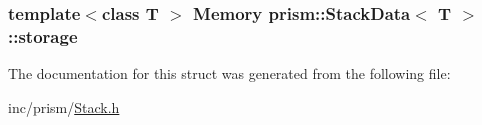 \subsubsection[{\texorpdfstring{storage}{storage}}]{\setlength{\rightskip}{0pt plus 5cm}template$<$class T $>$ {\bf Memory} {\bf prism\+::\+Stack\+Data}$<$ T $>$\+::storage}\hypertarget{structprism_1_1_stack_data_a5e74274b678041cfd7676d08eed3864a}{}\label{structprism_1_1_stack_data_a5e74274b678041cfd7676d08eed3864a}


The documentation for this struct was generated from the following file\+:\begin{DoxyCompactItemize}
\item 
inc/prism/\hyperlink{_stack_8h}{Stack.\+h}\end{DoxyCompactItemize}
